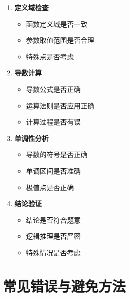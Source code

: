 \documentclass[a4paper,11pt]{ctexrep}
\theoremstyle{definition}
\begin{document}
\begin{warningbox}[快速检查清单]
\begin{enumerate}
    \item \textbf{定义域检查}
    \begin{itemize}
        \item 函数定义域是否一致
        \item 参数取值范围是否合理
        \item 特殊点是否考虑
    \end{itemize}
    
    \item \textbf{导数计算}
    \begin{itemize}
        \item 导数公式是否正确
        \item 运算法则是否应用正确
        \item 计算过程是否有误
    \end{itemize}
    
    \item \textbf{单调性分析}
    \begin{itemize}
        \item 导数的符号是否正确
        \item 单调区间是否准确
        \item 极值点是否正确
    \end{itemize}
    
    \item \textbf{结论验证}
    \begin{itemize}
        \item 结论是否符合题意
        \item 逻辑推理是否严密
        \item 特殊情况是否考虑
    \end{itemize}
\end{enumerate}
\end{warningbox}

\section{常见错误与避免方法}
\end{document}
